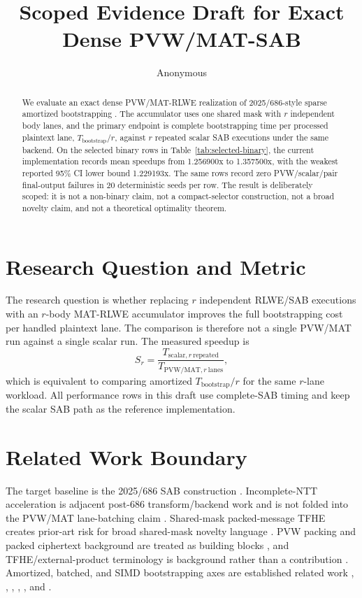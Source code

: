 \documentclass{article}
\title{Scoped Evidence Draft for Exact Dense PVW/MAT-SAB}
\author{Anonymous}
\date{}
\begin{document}
\maketitle

\begin{abstract}
We evaluate an exact dense PVW/MAT-RLWE realization of 2025/686-style sparse
amortized bootstrapping \cite{DBLP:conf/ccs/GuimaraesP25}. The accumulator uses one
shared mask with $r$ independent body lanes, and the primary endpoint is
complete bootstrapping time per processed plaintext lane, $T_{\mathrm{bootstrap}}/r$,
against $r$ repeated scalar SAB executions under the same backend. On the
selected binary rows in Table~\ref{tab:selected-binary}, the current
implementation records mean speedups from 1.256900x to 1.357500x,
with the weakest reported 95\% CI lower bound 1.229193x. The same
rows record zero PVW/scalar/pair final-output failures in 20 deterministic
seeds per row. The result is deliberately scoped: it is not a non-binary claim,
not a compact-selector construction, not a broad novelty claim, and not a
theoretical optimality theorem.
\end{abstract}

\section{Research Question and Metric}
The research question is whether replacing $r$ independent RLWE/SAB executions
with an $r$-body MAT-RLWE accumulator improves the full bootstrapping cost per
handled plaintext lane. The comparison is therefore not a single PVW/MAT run
against a single scalar run. The measured speedup is
\[
S_r = \frac{T_{\mathrm{scalar},r\ \mathrm{repeated}}}
           {T_{\mathrm{PVW/MAT},r\ \mathrm{lanes}}},
\]
which is equivalent to comparing amortized $T_{\mathrm{bootstrap}}/r$ for the
same $r$-lane workload. All performance rows in this draft use complete-SAB
timing and keep the scalar SAB path as the reference implementation.

\section{Related Work Boundary}
The target baseline is the 2025/686 SAB construction \cite{DBLP:conf/ccs/GuimaraesP25}.
Incomplete-NTT acceleration is adjacent post-686 transform/backend work and is
not folded into the PVW/MAT lane-batching claim \cite{DBLP:journals/tches/PaivaMHSY25}.
Shared-mask packed-message TFHE creates prior-art risk for broad shared-mask
novelty language \cite{DBLP:journals/tches/BergeratBCOPT25}. PVW packing and packed
ciphertext background are treated as building blocks \cite{DBLP:conf/pkc/BrakerskiGH13},
and TFHE/external-product terminology is background rather than a contribution
\cite{DBLP:journals/joc/ChillottiGGI20}. Amortized, batched, and SIMD bootstrapping axes
are established related work \cite{DBLP:conf/icalp/MicciancoS18}, \cite{DBLP:conf/asiacrypt/GuimaraesPL23},
\cite{DBLP:conf/pkc/MicheliKMS24}, \cite{DBLP:conf/asiacrypt/LiuW23},
\cite{DBLP:conf/eurocrypt/LiuW23}, and \cite{DBLP:conf/eurocrypt/LiuW23a}.
\end{document}

